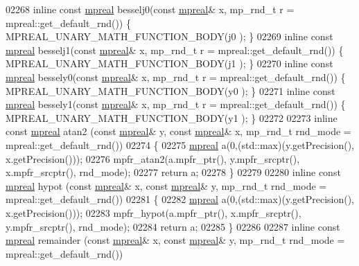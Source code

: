 \begin{DoxyCode}
{{02268 \textcolor{keyword}{inline} \textcolor{keyword}{const} \hyperlink{classmpfr_1_1mpreal}{mpreal} besselj0(\textcolor{keyword}{const} \hyperlink{classmpfr_1_1mpreal}{mpreal}& x, mp\_rnd\_t r = mpreal::get\_default\_rnd()) \{   
      MPREAL\_UNARY\_MATH\_FUNCTION\_BODY(j0     );    \}
02269 \textcolor{keyword}{inline} \textcolor{keyword}{const} \hyperlink{classmpfr_1_1mpreal}{mpreal} besselj1(\textcolor{keyword}{const} \hyperlink{classmpfr_1_1mpreal}{mpreal}& x, mp\_rnd\_t r = mpreal::get\_default\_rnd()) \{   
      MPREAL\_UNARY\_MATH\_FUNCTION\_BODY(j1     );    \}
02270 \textcolor{keyword}{inline} \textcolor{keyword}{const} \hyperlink{classmpfr_1_1mpreal}{mpreal} bessely0(\textcolor{keyword}{const} \hyperlink{classmpfr_1_1mpreal}{mpreal}& x, mp\_rnd\_t r = mpreal::get\_default\_rnd()) \{   
      MPREAL\_UNARY\_MATH\_FUNCTION\_BODY(y0     );    \}
02271 \textcolor{keyword}{inline} \textcolor{keyword}{const} \hyperlink{classmpfr_1_1mpreal}{mpreal} bessely1(\textcolor{keyword}{const} \hyperlink{classmpfr_1_1mpreal}{mpreal}& x, mp\_rnd\_t r = mpreal::get\_default\_rnd()) \{   
      MPREAL\_UNARY\_MATH\_FUNCTION\_BODY(y1     );    \}
02272 
02273 \textcolor{keyword}{inline} \textcolor{keyword}{const} \hyperlink{classmpfr_1_1mpreal}{mpreal} atan2 (\textcolor{keyword}{const} \hyperlink{classmpfr_1_1mpreal}{mpreal}& y, \textcolor{keyword}{const} \hyperlink{classmpfr_1_1mpreal}{mpreal}& x, mp\_rnd\_t rnd\_mode = 
      mpreal::get\_default\_rnd())
02274 \{
02275     \hyperlink{classmpfr_1_1mpreal}{mpreal} a(0,(std::max)(y.getPrecision(), x.getPrecision()));
02276     mpfr\_atan2(a.mpfr\_ptr(), y.mpfr\_srcptr(), x.mpfr\_srcptr(), rnd\_mode);
02277     \textcolor{keywordflow}{return} a;
02278 \}
02279 
02280 \textcolor{keyword}{inline} \textcolor{keyword}{const} \hyperlink{classmpfr_1_1mpreal}{mpreal} hypot (\textcolor{keyword}{const} \hyperlink{classmpfr_1_1mpreal}{mpreal}& x, \textcolor{keyword}{const} \hyperlink{classmpfr_1_1mpreal}{mpreal}& y, mp\_rnd\_t rnd\_mode = 
      mpreal::get\_default\_rnd())
02281 \{
02282     \hyperlink{classmpfr_1_1mpreal}{mpreal} a(0,(std::max)(y.getPrecision(), x.getPrecision()));
02283     mpfr\_hypot(a.mpfr\_ptr(), x.mpfr\_srcptr(), y.mpfr\_srcptr(), rnd\_mode);
02284     \textcolor{keywordflow}{return} a;
02285 \}
02286 
02287 \textcolor{keyword}{inline} \textcolor{keyword}{const} \hyperlink{classmpfr_1_1mpreal}{mpreal} remainder (\textcolor{keyword}{const} \hyperlink{classmpfr_1_1mpreal}{mpreal}& x, \textcolor{keyword}{const} \hyperlink{classmpfr_1_1mpreal}{mpreal}& y, mp\_rnd\_t rnd\_mode = 
      mpreal::get\_default\_rnd())
}}
\end{DoxyCode}
